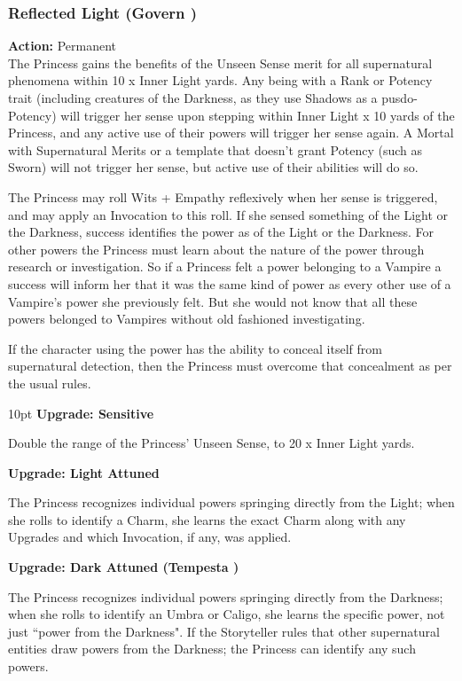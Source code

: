 \subsubsection*{Reflected Light (Govern \textbullet)}

\noindent \textbf{Action:} Permanent\\ 

\noindent The Princess gains the benefits of the Unseen Sense merit for all supernatural phenomena within 10 x Inner Light yards. Any being with a Rank or Potency trait (including creatures of the Darkness, as they use Shadows as a pusdo-Potency) will trigger her sense upon stepping within Inner Light x 10 yards of the Princess, and any active use of their powers will trigger her sense again. A Mortal with Supernatural Merits or a template that doesn't grant Potency (such as Sworn) will not trigger her sense, but active use of their abilities will do so. 

The Princess may roll Wits + Empathy reflexively when her sense is triggered, and may apply an Invocation to this roll. If she sensed something of the Light or the Darkness, success identifies the power as of the Light or the Darkness. For other powers the Princess must learn about the nature of the power through research or investigation. So if a Princess felt a power belonging to a Vampire a success will inform her that it was the same kind of power as every other use of a Vampire's power she previously felt. But she would not know that all these powers belonged to Vampires without old fashioned investigating. 

If the character using the power has the ability to conceal itself from supernatural detection, then the Princess must overcome that concealment as per the usual rules.  

\begin{myindentpar}{10pt} \textbf{Upgrade: Sensitive}

Double the range of the Princess' Unseen Sense, to 20 x Inner Light yards.

\textbf{Upgrade: Light Attuned}

The Princess recognizes individual powers springing directly from the Light; when she rolls to identify a Charm, she learns the exact Charm along with any Upgrades and which Invocation, if any, was applied. 

\textbf{Upgrade: Dark Attuned (Tempesta \textbullet)}

The Princess recognizes individual powers springing directly from the Darkness; when she rolls to identify an Umbra or Caligo, she learns the specific power, not just \textquotedblleft power from the Darkness". If the Storyteller rules that other supernatural entities draw powers from the Darkness; the Princess can identify any such powers.\end{myindentpar}


